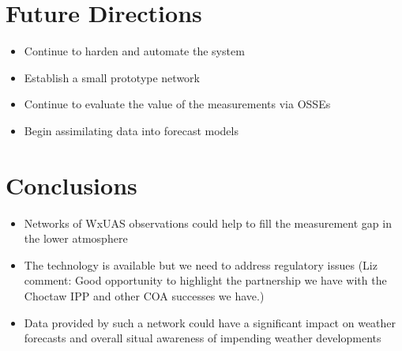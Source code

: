 \documentclass[sensors,review,submit,moreauthors,pdftex,10pt,a4paper]{mdpi}
\theoremstyle{mdpi}
\newcounter{re}
\theoremstyle{mdpidefinition}
\begin{document}
\section{Future Directions}
\begin{itemize}[leftmargin=*,labelsep=4mm]
\color{blue}
\item	Continue to harden and automate the system
\item	Establish a small prototype network 
\item	Continue to evaluate the value of the measurements via OSSEs
\item	Begin assimilating data into forecast models
\end{itemize}

\section{Conclusions}
\begin{itemize}[leftmargin=*,labelsep=4mm]
\color{blue}
\item	Networks of WxUAS observations could help to fill the measurement gap in the lower atmosphere
\item	The technology is available but we need to address regulatory issues (Liz comment: Good opportunity to highlight the partnership we have with the Choctaw IPP and other COA successes we have.)
\item	Data provided by such a network could have a significant impact on weather forecasts and overall situal awareness of impending weather developments
\end{itemize}

\vspace{6pt} 


\end{document}
